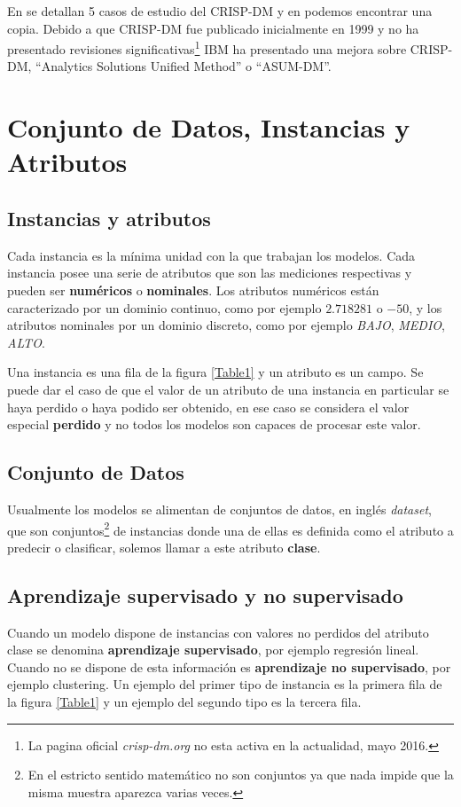 \documentclass[10pt,a4paper]{article}
\begin{document}
En \cite{larose2014discovering} se detallan 5 casos de estudio del CRISP-DM y en \cite{crispdmpdf} podemos encontrar una copia. Debido a que CRISP-DM fue publicado inicialmente en 1999 y no ha presentado revisiones significativas\footnote{La pagina oficial \textit{crisp-dm.org} no esta activa en la actualidad, mayo 2016.} IBM ha presentado una mejora sobre CRISP-DM, ``Analytics Solutions Unified Method'' o ``ASUM-DM''\cite{asumdmarticle}.

\section{Conjunto de Datos, Instancias y Atributos}
\subsection{Instancias y atributos}
Cada instancia es la mínima unidad con la que trabajan los modelos. Cada instancia posee una serie de atributos que son las mediciones respectivas y pueden ser \textbf{numéricos} o \textbf{nominales}. Los atributos numéricos están caracterizado por un dominio continuo, como por ejemplo $2.718281$ o $-50$, y los atributos nominales por un dominio discreto, como por ejemplo \textit{BAJO}, \textit{MEDIO}, \textit{ALTO}.

Una instancia es una fila de la figura \ref{Table1} y un atributo es un campo. Se puede dar el caso de que el valor de un atributo de una instancia en particular se haya perdido o haya podido ser obtenido, en ese caso se considera el valor especial \textbf{perdido} y no todos los modelos son capaces de procesar este valor.

\subsection{Conjunto de Datos}
Usualmente los modelos se alimentan de conjuntos de datos, en inglés \textit{dataset}, que son conjuntos\footnote{En el estricto sentido matemático no son conjuntos ya que nada impide que la misma muestra aparezca varias veces.} de instancias donde una de ellas es definida como el atributo a predecir o clasificar, solemos llamar a este atributo \textbf{clase}.

\subsection{Aprendizaje supervisado y no supervisado}
Cuando un modelo dispone de instancias con valores no perdidos del atributo clase se denomina \textbf{aprendizaje supervisado}, por ejemplo regresión lineal. Cuando no se dispone de esta información es \textbf{aprendizaje no supervisado}, por ejemplo clustering. Un ejemplo del primer tipo de instancia es la primera fila de la figura \ref{Table1} y un ejemplo del segundo tipo es la tercera fila.
\end{document}
